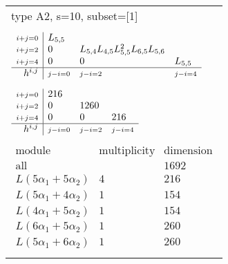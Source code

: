 \documentclass[crop,border=2mm]{standalone}
\begin{document}
\begin{tabular}{l}
{\huge type A2, s=10, subset=[1]}\\ \\


$\displaystyle
\begin{array}{r|l l l}
	{\scriptstyle i+j=0}&L_{5,5}&&\\
	{\scriptstyle i+j=2}&0&L_{5,4}L_{4,5}L_{5,5}^{2}L_{6,5}L_{5,6}&\\
	{\scriptstyle i+j=4}&0&0&L_{5,5}\\
	\hline h^{i,j}&{\scriptstyle j-i=0}&{\scriptstyle j-i=2}&{\scriptstyle j-i=4}
\end{array}
$ \\ \\


$\displaystyle
\begin{array}{r|l l l}
	{\scriptstyle i+j=0}&216&&\\
	{\scriptstyle i+j=2}&0&1260&\\
	{\scriptstyle i+j=4}&0&0&216\\
	\hline h^{i,j}&{\scriptstyle j-i=0}&{\scriptstyle j-i=2}&{\scriptstyle j-i=4}
\end{array}
$ \\ \\


$\displaystyle
\begin{array}{rll}
	\text{module}&\text{multiplicity}&\text{dimension} \\ \hline \text{all}&&1692 \\
	L\left( 5\alpha_{1}+ 5\alpha_{2}\right)&4&216\\
	L\left( 5\alpha_{1}+ 4\alpha_{2}\right)&1&154\\
	L\left( 4\alpha_{1}+ 5\alpha_{2}\right)&1&154\\
	L\left( 6\alpha_{1}+ 5\alpha_{2}\right)&1&260\\
	L\left( 5\alpha_{1}+ 6\alpha_{2}\right)&1&260
\end{array}
$ \\ \\

\end{tabular}
\end{document}
